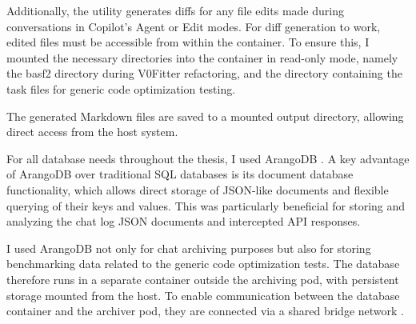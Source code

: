 Additionally, the utility generates diffs for any file edits made during conversations in Copilot's Agent or Edit modes.
For diff generation to work, edited files must be accessible from within the container. 
To ensure this, I mounted the necessary directories into the container in read-only mode, namely the basf2 directory during V0Fitter refactoring, and the directory containing the task files for generic code optimization testing.

The generated Markdown files are saved to a mounted output directory, allowing direct access from the host system.

For all database needs throughout the thesis, I used ArangoDB \cite{arangodb}.
A key advantage of ArangoDB over traditional SQL databases is its document database functionality, which allows direct storage of JSON-like documents and flexible querying of their keys and values.
This was particularly beneficial for storing and analyzing the chat log JSON documents and intercepted API responses.

I used ArangoDB not only for chat archiving purposes but also for storing benchmarking data related to the generic code optimization tests. 
The database therefore runs in a separate container outside the archiving pod, with persistent storage mounted from the host. 
To enable communication between the database container and the archiver pod, they are connected via a shared bridge network \cite{bridge-network}.